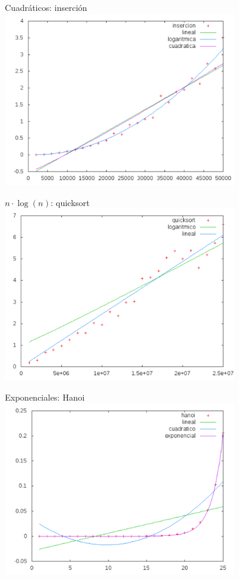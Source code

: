\documentclass[10pt,compress,usetitleprogressbar,mathserif]{beamer}
\begin{document}
\begin{frame}{Cuadráticos: inserción}
	\includegraphics[width = 10cm ]{img/cuad_hibrida.pdf}
\end{frame}

\begin{frame}{$n \cdot \log(n)$: quicksort}
	\includegraphics[width = 10cm ]{img/log_hibrida.pdf}
\end{frame}

\begin{frame}{Exponenciales: Hanoi}
	\includegraphics[width = 10cm ]{img/expo_hibrida2.pdf}
\end{frame}
\end{document}
